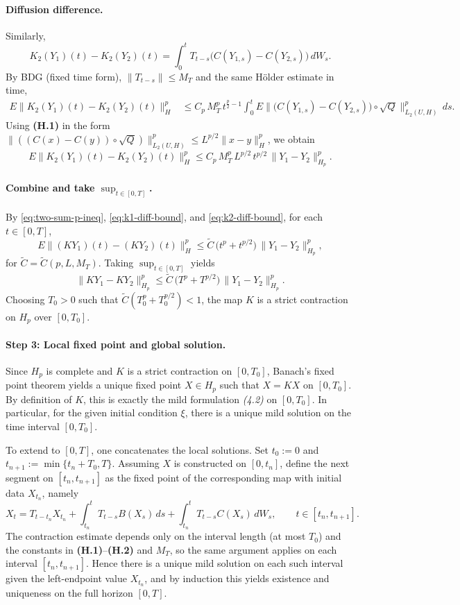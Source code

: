 \documentclass[11pt]{article}
\theoremstyle{definition}
\theoremstyle{remark}
\begin{document}
\paragraph{Diffusion difference.}
Similarly,
\[
    K_2(Y_1)(t)-K_2(Y_2)(t)
    =
    \int_0^t T_{t-s}\bigl(C(Y_{1,s})-C(Y_{2,s})\bigr)\,dW_s.
\]
By BDG (fixed time form), $\|T_{t-s}\|\le M_T$ and the same H\"older estimate in time,
\[
\begin{aligned}
    E\|K_2(Y_1)(t)-K_2(Y_2)(t)\|_H^p
    &\le
    C_p\,M_T^p\,t^{\frac p2-1}\int_0^t
    E\|\bigl(C(Y_{1,s})-C(Y_{2,s})\bigr)\circ\sqrt{Q}\|_{L_2(U,H)}^p\,ds.
\end{aligned}
\]
Using \textbf{(H.1)} in the form
$\|((C(x)-C(y))\circ\sqrt{Q})\|_{L_2(U,H)}^p\le L^{p/2}\|x-y\|_H^p$, we obtain
\begin{equation}\label{eq:k2-diff-bound}
    E\|K_2(Y_1)(t)-K_2(Y_2)(t)\|_H^p
    \le
    C_p\,M_T^p\,L^{p/2}\,t^{p/2}\,\|Y_1-Y_2\|_{H_p}^p.
\end{equation}

\paragraph{Combine and take $\sup_{t\in[0,T]}$.}
By \eqref{eq:two-sum-p-ineq}, \eqref{eq:k1-diff-bound}, and \eqref{eq:k2-diff-bound},
for each $t\in[0,T]$,
\[
    E\|(KY_1)(t)-(KY_2)(t)\|_H^p
    \le
    \widetilde{C}\,\bigl(t^{p}+t^{p/2}\bigr)\,\|Y_1-Y_2\|_{H_p}^p,
\]
for $\widetilde{C}=\widetilde{C}(p,L,M_T)$.
Taking $\sup_{t\in[0,T]}$ yields
\[
    \|KY_1-KY_2\|_{H_p}^p
    \le
    \widetilde{C}\,\bigl(T^{p}+T^{p/2}\bigr)\,\|Y_1-Y_2\|_{H_p}^p.
\]
Choosing $T_0>0$ such that $\widetilde{C}(T_0^{p}+T_0^{p/2})<1$, the map $K$
is a strict contraction on $H_p$ over $[0,T_0]$.

\paragraph{Step 3: Local fixed point and global solution.}
Since $H_p$ is complete and $K$ is a strict contraction on $[0,T_0]$,
Banach's fixed point theorem yields a unique fixed point $X\in H_p$ such that
$X=KX$ on $[0,T_0]$.  By definition of $K$, this is exactly the mild
formulation \emph{(4.2)} on $[0,T_0]$.
In particular, for the given initial condition $\xi$, there is a unique mild solution on the
time interval $[0,T_0]$.

To extend to $[0,T]$, one concatenates the local solutions.  Set $t_0:=0$ and
$t_{n+1}:=\min\{t_n+T_0,T\}$.  Assuming $X$ is constructed on $[0,t_n]$, define the next
segment on $[t_n,t_{n+1}]$ as the fixed point of the corresponding map with initial data
$X_{t_n}$, namely
\[
    X_t
    =
    T_{t-t_n}X_{t_n}
    +
    \int_{t_n}^t T_{t-s}B(X_s)\,ds
    +
    \int_{t_n}^t T_{t-s}C(X_s)\,dW_s,
    \qquad t\in[t_n,t_{n+1}].
\]
The contraction estimate depends only on the interval length (at most $T_0$) and the constants
in \textbf{(H.1)}--\textbf{(H.2)} and $M_T$, so the same argument applies on each interval
$[t_n,t_{n+1}]$.  Hence there is a unique mild solution on each such interval given the
left-endpoint value $X_{t_n}$, and by induction this yields existence and uniqueness on the
full horizon $[0,T]$.
\end{document}
